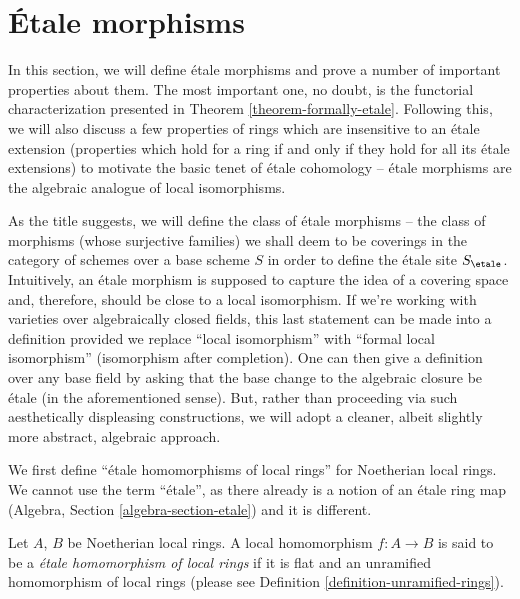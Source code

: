 \section{\'Etale morphisms}
\label{section-etale-morphisms}

\noindent
In this section, we will define \'etale morphisms and prove a number of
important properties about them. The most important one, no doubt, is the
functorial characterization presented in Theorem \ref{theorem-formally-etale}.
Following this, we will also discuss a few properties of rings which are
insensitive to an \'etale extension (properties which hold for a ring
if and only if they hold for all its \'etale extensions) to motivate the basic
tenet of \'etale cohomology -- \'etale morphisms are the algebraic analogue of
local isomorphisms.

\medskip\noindent
As the title suggests, we will define the class of \'etale morphisms -- the
class of morphisms (whose surjective families) we shall deem to be coverings
in the category of schemes over a base scheme $S$ in order to define the
\'etale site $S_\etale$. Intuitively, an \'etale morphism is supposed
to capture the idea of a covering space and, therefore, should be close to a
local isomorphism. If we're working with varieties over algebraically closed
fields, this last statement can be made into a definition provided we replace
``local isomorphism'' with ``formal local isomorphism'' (isomorphism after
completion). One can then give a definition over any base field by asking
that the base change to the algebraic closure be \'etale (in the
aforementioned sense). But, rather than proceeding via such aesthetically
displeasing constructions, we will adopt a cleaner, albeit slightly more
abstract, algebraic approach.

\medskip\noindent
We first define ``\'etale homomorphisms of local rings'' for Noetherian
local rings. We cannot use the term ``\'etale'', as there already
is a notion of an \'etale ring map
(Algebra, Section \ref{algebra-section-etale})
and it is different.

\begin{definition}
\label{definition-etale-ring}
Let $A$, $B$ be Noetherian local rings.
A local homomorphism $f : A \to B$ is said to be a
{\it \'etale homomorphism of local rings}
if it is flat and an unramified homomorphism of local rings
(please see Definition \ref{definition-unramified-rings}).
\end{definition}

